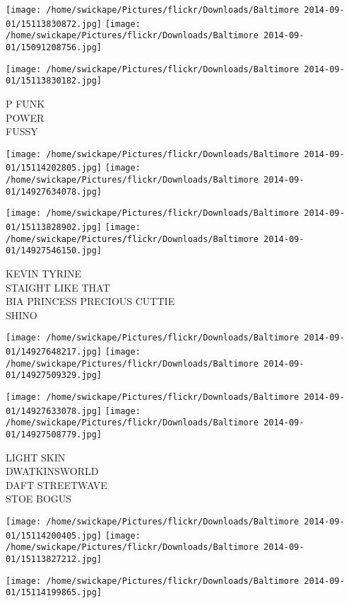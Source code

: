 \documentclass[10pt,letterpaper]{article}
\begin{document}
\texttt{[image: /home/swickape/Pictures/flickr/Downloads/Baltimore 2014-09-01/15113830872.jpg]}
\texttt{[image: /home/swickape/Pictures/flickr/Downloads/Baltimore 2014-09-01/15091208756.jpg]}

\vspace{0.25in}
\texttt{[image: /home/swickape/Pictures/flickr/Downloads/Baltimore 2014-09-01/15113830182.jpg]}

P FUNK\\
POWER\\
FUSSY\\
\pagebreak

\texttt{[image: /home/swickape/Pictures/flickr/Downloads/Baltimore 2014-09-01/15114202805.jpg]}
\texttt{[image: /home/swickape/Pictures/flickr/Downloads/Baltimore 2014-09-01/14927634078.jpg]}

\texttt{[image: /home/swickape/Pictures/flickr/Downloads/Baltimore 2014-09-01/15113828902.jpg]}
\texttt{[image: /home/swickape/Pictures/flickr/Downloads/Baltimore 2014-09-01/14927546150.jpg]}

KEVIN TYRINE\\
STAIGHT LIKE THAT\\
BIA PRINCESS PRECIOUS CUTTIE\\
SHINO\\
\pagebreak

\texttt{[image: /home/swickape/Pictures/flickr/Downloads/Baltimore 2014-09-01/14927648217.jpg]}
\texttt{[image: /home/swickape/Pictures/flickr/Downloads/Baltimore 2014-09-01/14927509329.jpg]}

\texttt{[image: /home/swickape/Pictures/flickr/Downloads/Baltimore 2014-09-01/14927633078.jpg]}
\texttt{[image: /home/swickape/Pictures/flickr/Downloads/Baltimore 2014-09-01/14927508779.jpg]}

LIGHT SKIN\\
DWATKINSWORLD\\
DAFT STREETWAVE\\
STOE BOGUS\\
\pagebreak

\texttt{[image: /home/swickape/Pictures/flickr/Downloads/Baltimore 2014-09-01/15114200405.jpg]}
\texttt{[image: /home/swickape/Pictures/flickr/Downloads/Baltimore 2014-09-01/15113827212.jpg]}

\texttt{[image: /home/swickape/Pictures/flickr/Downloads/Baltimore 2014-09-01/15114199865.jpg]}
\end{document}
